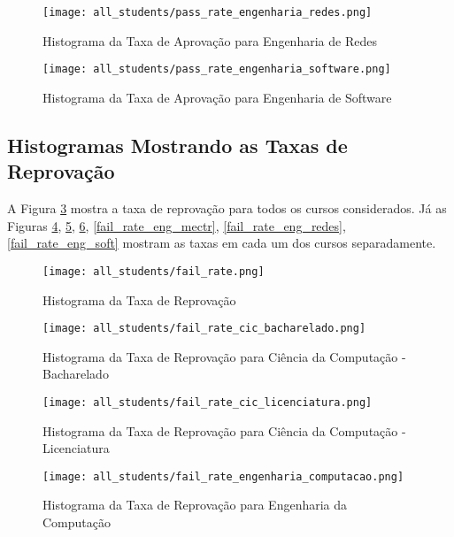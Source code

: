 \begin{figure}[!ht]
    \caption{Histograma da Taxa de Aprovação para Engenharia de Redes}
    \centering
    \texttt{[image: all\_students/pass\_rate\_engenharia\_redes.png]}
    \label{pass_rate_eng_redes}
\end{figure}

\begin{figure}[!ht]
    \caption{Histograma da Taxa de Aprovação para Engenharia de Software}
    \centering
    \texttt{[image: all\_students/pass\_rate\_engenharia\_software.png]}
    \label{pass_rate_eng_soft}
\end{figure}

\clearpage

\subsection{Histogramas Mostrando as Taxas de Reprovação}
A Figura \ref{fail_rate_all} mostra a taxa de reprovação para todos os cursos
considerados. 
Já as Figuras \ref{fail_rate_cic_b}, \ref{fail_rate_cic_lic},
\ref{fail_rate_eng_comp}, \ref{fail_rate_eng_mectr}, \ref{fail_rate_eng_redes},
\ref{fail_rate_eng_soft} mostram as taxas em cada um dos cursos separadamente. 


\begin{figure}[!ht]
    \caption{Histograma da Taxa de Reprovação}
    \centering
    \texttt{[image: all\_students/fail\_rate.png]}
    \label{fail_rate_all}
\end{figure}

\begin{figure}[!ht]
    \caption{Histograma da Taxa de Reprovação para Ciência da Computação - Bacharelado}
    \centering
    \texttt{[image: all\_students/fail\_rate\_cic\_bacharelado.png]}
    \label{fail_rate_cic_b}
\end{figure}

\begin{figure}[!ht]
    \caption{Histograma da Taxa de Reprovação para Ciência da Computação -
    Licenciatura}
    \centering
    \texttt{[image: all\_students/fail\_rate\_cic\_licenciatura.png]}
    \label{fail_rate_cic_lic}
\end{figure}

\begin{figure}[!ht]
    \caption{Histograma da Taxa de Reprovação para Engenharia da Computação}
    \centering
    \texttt{[image: all\_students/fail\_rate\_engenharia\_computacao.png]}
    \label{fail_rate_eng_comp}
\end{figure}

